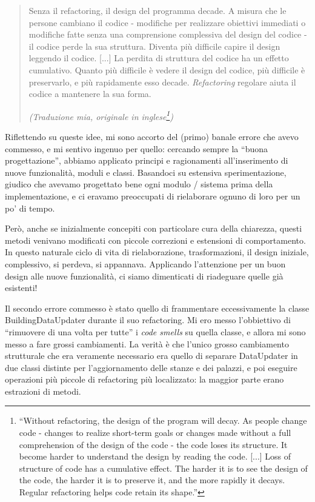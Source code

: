 \documentclass[12pt]{report}
\begin{document}
\begin{quote}
Senza il refactoring, il design del programma decade. A misura che le persone
cambiano il codice - modifiche per realizzare obiettivi immediati o modifiche
fatte senza una comprensione complessiva del design del codice - il codice
perde la sua struttura. Diventa più difficile capire il design leggendo
il codice. [...] La perdita di struttura del codice ha un effetto cumulativo.
Quanto più difficile è vedere il design del codice, più difficile è 
preservarlo, e più rapidamente esso decade. \textit{Refactoring} regolare aiuta
il codice a mantenere la sua forma. \cite{fowler2002} 

\flushright
\textit{(Traduzione mia, originale in inglese\footnote{
``Without 
refactoring, the design of the program will decay. As people change
code - changes to realize short-term goals or changes made without a full
comprehension of the design of the code - the code loses its structure. 
It become harder to understand the design by reading the code. [...] 
Loss of structure of code has a cumulative effect. The harder 
it is to see the design of the code, the harder it is to preserve 
it, and the more rapidly it decays. Regular refactoring helps 
code retain its shape.''
})
}
\end{quote}

Riflettendo su queste idee, mi sono accorto del
(primo) banale errore che avevo commesso, e mi 
sentivo ingenuo per quello: cercando sempre la ``buona progettazione'', 
abbiamo applicato principi e ragionamenti all'inserimento di nuove 
funzionalità, moduli e classi. Basandoci su estensiva sperimentazione, 
giudico che avevamo progettato bene ogni modulo / sistema 
prima della implementazione, e ci eravamo preoccupati 
di rielaborare ognuno di loro per un po' di tempo.

Però, anche se inizialmente concepiti con particolare cura della chiarezza, 
questi metodi venivano modificati con piccole correzioni e estensioni di 
comportamento. In questo naturale ciclo di vita di rielaborazione, 
trasformazioni, il design iniziale, complessivo, si perdeva, si appannava. 
Applicando l'attenzione per un buon design alle nuove funzionalità, ci 
siamo dimenticati di riadeguare quelle già esistenti!

Il secondo errore commesso è stato quello di frammentare eccessivamente la
classe BuildingDataUpdater durante il suo refactoring. Mi ero messo l'obbiettivo
di ``rimuovere di una volta per tutte'' i \textit{code smells} su quella classe,
e allora mi sono messo a fare grossi cambiamenti. La verità è che l'unico
grosso cambiamento strutturale che era veramente necessario era quello di separare
DataUpdater in due classi distinte per l'aggiornamento delle stanze e dei 
palazzi, e poi eseguire operazioni più piccole di refactoring più localizzato:
la maggior parte erano estrazioni di metodi.
\end{document}
